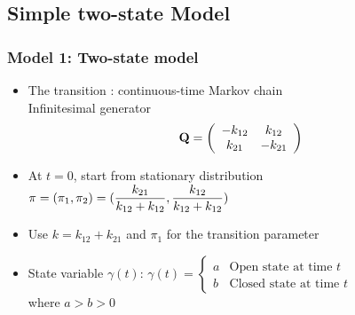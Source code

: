 \documentclass[11pt]{beamer}
\newcommand{\bit}{\begin{itemize}\setlength{\itemsep}{0cm}\setlength{\topsep}{0cm}}
\newcommand{\eit}{\end{itemize}}
\newcommand{\bQ}{{\bf Q}}
\newcommand{\bpi}{{\bf \pi}}
\begin{document}
\subsection{Simple two-state Model}
\begin{frame}
\frametitle{Model 1: Two-state model}
\bit
\pause
\item 
The transition : continuous-time Markov chain \\
Infinitesimal generator
$$\bQ=\left(\begin{array}{cc}
-k_{12} & k_{12}\\
k_{21}& -k_{21}
\end{array}\right)$$ 
\pause
\item At $t=0$, start from stationary distribution $\bpi=(\pi_1,\pi_2)=(\dfrac{k_{21}}{k_{12}+k_{12}},\dfrac{k_{12}}{k_{12}+k_{12}})$
\item Use $k=k_{12}+k_{21}$ and $\pi_1$ for the transition parameter
\pause
\item State variable $\gamma(t)$: $\gamma(t)=\left\{\begin{array}{ll}
a &   \mbox{Open state at time }t\\
b & \mbox{Closed state at time }t
\end{array}\right.$\\
where $a>b>0$
\eit
\end{frame}
\end{document}
